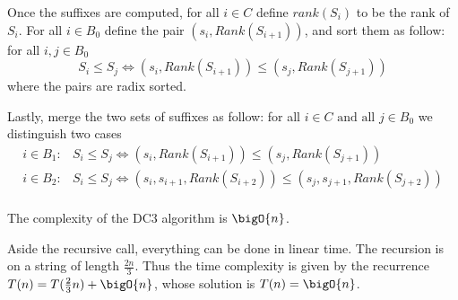\documentclass{subfiles}
\begin{document}
    Once the suffixes are computed, 
        for all \(i \in C\) define \(rank(S_{i})\) to be the rank of \(S_{i}\).
    For all \(i \in B_{0}\) define the pair \((s_{i}, Rank(S_{i + 1}))\),
        and sort them as follow: for all \(i, j \in B_{0}\)
        \[
            S_{i} \le S_{j} \iff (s_{i}, Rank(S_{i + 1})) \le (s_{j}, Rank(S_{j + 1}))
        \]
        where the pairs are radix sorted.

    Lastly, merge the two sets of suffixes as follow:
        for all \(i \in C \text{ and all } j \in B_{0}\) we distinguish two cases
        \[\begin{aligned}
            i \in B_{1}:& S_{i} \le S_{j} \iff (s_{i}, Rank(S_{i + 1})) \le (s_{j}, Rank(S_{j + 1})) \\
            i \in B_{2}:&  S_{i} \le S_{j} \iff 
                (s_{i}, s_{i +1}, Rank(S_{i + 2})) \le (s_{j}, s_{j + 1}, Rank(S_{j + 2})) \\
        \end{aligned}\]
    \begin{theorem*}
        The complexity of the DC3 algorithm is \(\bigO{n}\).
    \end{theorem*}
    \begin{proof*}
        Aside the recursive call, everything can be done in linear time. 
        The recursion is on a string of length \(\tfrac{2n}{3}\).
        Thus the time complexity is given by the recurrence \(T(n) = T(\tfrac{2}{3}n) + \bigO{n}\),
        whose solution is \(T(n) = \bigO{n}\).
    \end{proof*}
\end{document}
